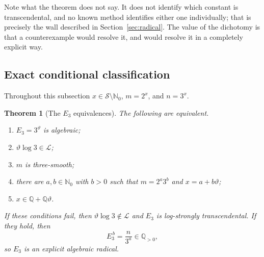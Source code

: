 \documentclass[11pt,oneside]{article}
\newtheorem{theorem}{Theorem}[section]
\theoremstyle{definition}
\theoremstyle{remark}
\newcommand{\Nzero}{\mathbb N_0}
\newcommand{\Q}{\mathbb Q}
\newcommand{\thetaq}{\vartheta}
\newcommand{\Sol}{\mathcal S}
\newcommand{\LL}{\mathcal L}
\begin{document}
Note what the theorem does not say.  It does not identify which constant is transcendental,
and no known method identifies either one individually; that is precisely the wall described
in Section~\ref{sec:radical}.  The value of the dichotomy is that a counterexample would
resolve it, and would resolve it in a completely explicit way.

\subsection{Exact conditional classification}

Throughout this subsection $x\in\Sol\setminus\Nzero$, $m=2^x$, and $n=3^x$.

\begin{theorem}[The $E_3$ equivalences]
\label{tw:E3}
The following are equivalent.
\begin{enumerate}[label=\textup{(\roman*)}]
\item $E_3=3^{\thetaq}$ is algebraic;
\item $\thetaq\log3\in\LL$;
\item $m$ is three-smooth;
\item there are $a,b\in\Nzero$ with $b>0$ such that $m=2^a3^b$ and $x=a+b\thetaq$;
\item $x\in\Q+\Q\thetaq$.
\end{enumerate}
If these conditions fail, then $\thetaq\log3\notin\LL$ and $E_3$ is log-strongly
transcendental.  If they hold, then
\begin{equation}
 E_3^{\,b}=\frac{n}{3^a}\in\Q_{>0},
 \label{tw:eq-E3-radical}
\end{equation}
so $E_3$ is an explicit algebraic radical.
\end{theorem}
\end{document}

